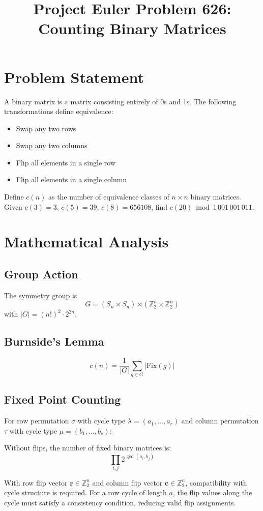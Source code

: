 \documentclass[12pt]{article}
\title{Project Euler Problem 626: Counting Binary Matrices}
\author{}
\date{}
\begin{document}
\maketitle

\section{Problem Statement}
A binary matrix is a matrix consisting entirely of 0s and 1s. The following transformations define equivalence:
\begin{itemize}
  \item Swap any two rows
  \item Swap any two columns
  \item Flip all elements in a single row
  \item Flip all elements in a single column
\end{itemize}

Define $c(n)$ as the number of equivalence classes of $n \times n$ binary matrices. Given $c(3)=3$, $c(5)=39$, $c(8)=656108$, find $c(20) \bmod 1\,001\,001\,011$.

\section{Mathematical Analysis}

\subsection{Group Action}
The symmetry group is
\[
G = (S_n \times S_n) \rtimes (\mathbb{Z}_2^n \times \mathbb{Z}_2^n)
\]
with $|G| = (n!)^2 \cdot 2^{2n}$.

\subsection{Burnside's Lemma}
\[
c(n) = \frac{1}{|G|} \sum_{g \in G} |\mathrm{Fix}(g)|
\]

\subsection{Fixed Point Counting}
For row permutation $\sigma$ with cycle type $\lambda = (a_1, \ldots, a_r)$ and column permutation $\tau$ with cycle type $\mu = (b_1, \ldots, b_s)$:

Without flips, the number of fixed binary matrices is:
\[
\prod_{i,j} 2^{\gcd(a_i, b_j)}
\]

With row flip vector $\mathbf{r} \in \mathbb{Z}_2^n$ and column flip vector $\mathbf{c} \in \mathbb{Z}_2^n$, compatibility with cycle structure is required. For a row cycle of length $a$, the flip values along the cycle must satisfy a consistency condition, reducing valid flip assignments.
\end{document}
